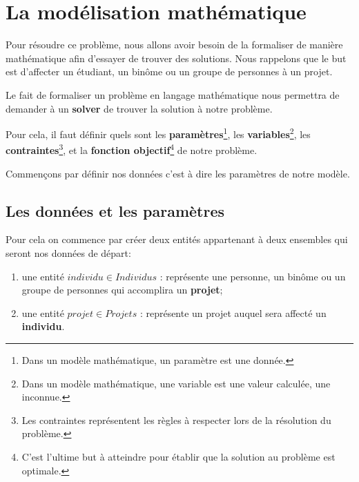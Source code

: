 \documentclass[final,poster]{polytech/polytech}
\begin{document}
\section{La modélisation mathématique\label{sec:mod_math}}


Pour résoudre ce problème, nous allons avoir besoin de la formaliser de manière mathématique afin d'essayer de trouver des solutions.
Nous rappelons que le but est d'affecter un étudiant, un binôme ou un groupe de personnes à un projet.

Le fait de formaliser un problème en langage mathématique nous permettra de demander à un \textbf{solver} de trouver la solution à notre problème.

Pour cela, il faut définir quels sont les \textbf{paramètres}\footnote{Dans un modèle mathématique, un paramètre est une donnée.}, les \textbf{ variables}\footnote{Dans un modèle mathématique, une variable est une valeur calculée, une inconnue.}, les \textbf{contraintes}\footnote{Les contraintes représentent les règles à respecter lors de la résolution du problème.}, et la \textbf{fonction objectif}\footnote{C'est l'ultime but à atteindre pour établir que la solution au problème est optimale.} de notre problème.

Commençons par définir nos données c'est à dire les paramètres de notre modèle.

\subsection{Les données et les paramètres\label{sec:donnees_params}}

Pour cela on commence par créer deux entités appartenant à deux ensembles qui seront nos données de départ:
\begin{enumerate}
\item une entité $individu \in Individus$ : représente une personne, un binôme ou un groupe de personnes qui accomplira un \textbf{projet};
\item une entité  $projet \in Projets$ : représente un projet auquel sera affecté un \textbf{individu}.
\end{enumerate}
\end{document}
